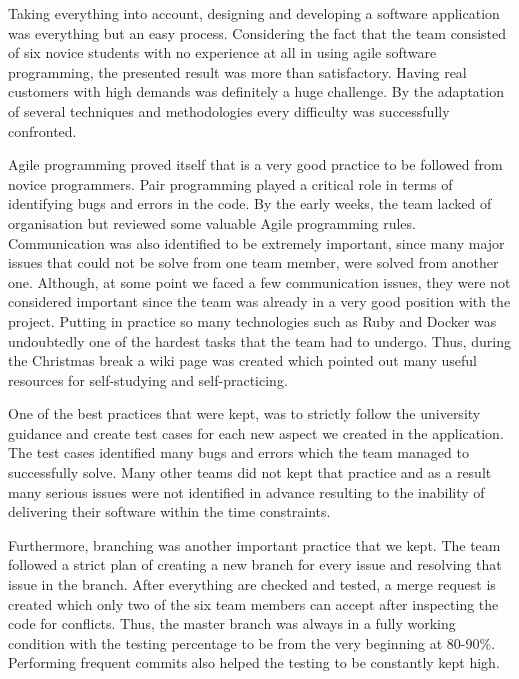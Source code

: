 \documentclass{l3proj}
\begin{document}
Taking everything into account, designing and developing a software application was everything but an easy process. Considering the fact that the team consisted of six novice students with no experience at all in using agile software programming, the presented result was more than satisfactory. Having real customers with high demands was definitely a huge challenge. By the adaptation of several techniques and methodologies every difficulty was successfully confronted.

Agile programming proved itself that is a very good practice to be followed from novice programmers. Pair programming played a critical role in terms of identifying bugs and errors in the code. By the early weeks, the team lacked of organisation but reviewed some valuable Agile programming rules. Communication was also identified to be extremely important, since many major issues that could not be solve from one team member, were solved from another one. Although, at some point we faced a few communication issues, they were not considered important since the team was already in a very good position with the project. Putting in practice so many technologies such as Ruby and Docker was undoubtedly one of the hardest tasks that the team had to undergo. Thus, during the Christmas break a wiki page was created which pointed out many useful resources for self-studying and self-practicing.

One of the best practices that were kept, was to strictly follow the university guidance and create test cases for each new aspect we created in the application. The test cases identified many bugs and errors which the team managed to successfully solve. Many other teams did not kept that practice and as a result many serious issues were not identified in advance resulting to the inability of delivering their software within the time constraints.

Furthermore, branching was another important practice that we kept. The team followed a strict plan of creating a new branch for every issue and resolving that issue in the branch. After everything are checked and tested, a merge request is created which only two of the six team members can accept after inspecting the code for conflicts. Thus, the master branch was always in a fully working condition with the testing percentage to be from the very beginning at 80-90\%. Performing frequent commits also helped the testing to be constantly kept high.
\end{document}
